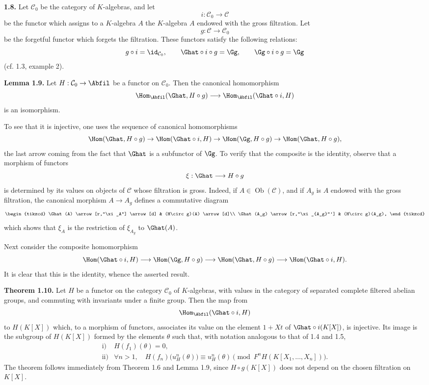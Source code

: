 \documentclass[11pt]{article}
\begin{document}
\textbf{1.8.} Let \(\mathcal C_0\) be the category of \(K\)-algebras, and let
\[
  i:\mathcal C_0\longrightarrow\mathcal C
\]
be the functor which assigns to a \(K\)-algebra \(A\) the \(K\)-algebra \(A\) endowed with the gross filtration. Let
\[
  g:\mathcal C\longrightarrow\mathcal C_0
\]
be the forgetful functor which forgets the filtration. These functors satisfy the following relations:
\[
  g\circ i=\id_{\mathcal C_0},\qquad
  \Ghat\circ i\circ g=\Gg,\qquad
  \Gg\circ i\circ g=\Gg
\]
(cf. 1.3, example 2).

\textbf{Lemma 1.9.} Let \(H:\mathcal C_0\to\Abfil\) be a functor on \(\mathcal C_0\). Then the canonical homomorphism
\[
  \Hom_{\Abfil}(\Ghat,H\circ g)
  \longrightarrow
  \Hom_{\Abfil}(\Ghat\circ i,H)
\]
is an isomorphism.

To see that it is injective, one uses the sequence of canonical homomorphisms
\[
 \Hom(\Ghat,H\circ g)\to
 \Hom(\Ghat\circ i,H)\to
 \Hom(\Gg,H\circ g)\to
 \Hom(\Ghat,H\circ g),
\]
the last arrow coming from the fact that \(\Ghat\) is a subfunctor of \(\Gg\). To verify that the composite is the identity, observe that a morphism of functors
\[
  \xi:\Ghat\longrightarrow H\circ g
\]
is determined by its values on objects of \(\mathcal C\) whose filtration is gross. Indeed, if \(A\in\operatorname{Ob}(\mathcal C)\), and if \(A_g\) is \(A\) endowed with the gross filtration, the canonical morphism \(A\to A_g\) defines a commutative diagram
\[
\begin{tikzcd}
\Ghat(A) \arrow[r,"\xi_A"] \arrow[d] &
(H\circ g)(A) \arrow[d]\\
\Ghat(A_g) \arrow[r,"\xi_{A_g}"'] &
(H\circ g)(A_g),
\end{tikzcd}
\]
which shows that \(\xi_A\) is the restriction of \(\xi_{A_g}\) to \(\Ghat(A)\).

Next consider the composite homomorphism
\[
  \Hom(\Ghat\circ i,H)\longrightarrow
  \Hom(\Gg,H\circ g)\longrightarrow
  \Hom(\Ghat,H\circ g)\longrightarrow
  \Hom(\Ghat\circ i,H).
\]
It is clear that this is the identity, whence the asserted result.

\textbf{Theorem 1.10.} Let \(H\) be a functor on the category \(\mathcal C_0\) of \(K\)-algebras, with values in the category of separated complete filtered abelian groups, and commuting with invariants under a finite group. Then the map from
\[
  \Hom_{\Abfil}(\Ghat\circ i,H)
\]
to \(H(K[X])\) which, to a morphism of functors, associates its value on the element \(1+Xt\) of \(\Ghat\circ i(K[X])\), is injective. Its image is the subgroup of \(H(K[X])\) formed by the elements \(\theta\) such that, with notation analogous to that of 1.4 and 1.5,
\[
\begin{array}{ll}
\text{i)}& H(f_1)(\theta)=0,\\[0.3em]
\text{ii)}& \forall n>1,\quad
 H(f_n)\bigl(u_H^n(\theta)\bigr)\equiv u_H^n(\theta)
 \pmod{F^nH(K[X_1,\ldots,X_n])}.
\end{array}
\]
The theorem follows immediately from Theorem 1.6 and Lemma 1.9, since \(H\circ g(K[X])\) does not depend on the chosen filtration on \(K[X]\).
\end{document}
